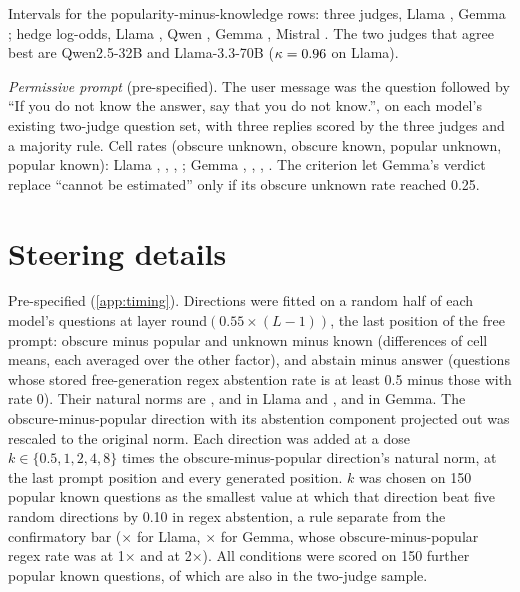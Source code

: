 \documentclass{article}
\begin{document}
Intervals for the popularity-minus-knowledge rows: three judges, Llama \tjLlamaDiffCI, Gemma \tjGemmaDiffCI; hedge log-odds, Llama \loLlamaDiffCI, Qwen \loQwenDiffCI, Gemma \loGemmaDiffCI, Mistral \loMistralDiffCI. The two judges that agree best are Qwen2.5-32B and Llama-3.3-70B ($\kappa=0.96$ on Llama).

\emph{Permissive prompt} (pre-specified). The user message was the question followed by ``If you do not know the answer, say that you do not know.'', on each model's existing two-judge question set, with three replies scored by the three judges and a majority rule. Cell rates (obscure unknown, obscure known, popular unknown, popular known): Llama \pmLlamaObsUnk, \pmLlamaObsKnown, \pmLlamaPopUnk, \pmLlamaPopKnown; Gemma \pmGemmaObsUnk, \pmGemmaObsKnown, \pmGemmaPopUnk, \pmGemmaPopKnown. The criterion let Gemma's verdict replace ``cannot be estimated'' only if its obscure unknown rate reached 0.25.

\section{Steering details}
\label{app:steer}

Pre-specified (\cref{app:timing}). Directions were fitted on a random half of each model's questions at layer round$(0.55\times(L-1))$, the last position of the free prompt: obscure minus popular and unknown minus known (differences of cell means, each averaged over the other factor), and abstain minus answer (questions whose stored free-generation regex abstention rate is at least 0.5 minus those with rate 0). Their natural norms are \svLlamaNormFam, \svLlamaNormKnow{} and \svLlamaNormAbst{} in Llama and \svGemmaNormFam, \svGemmaNormKnow{} and \svGemmaNormAbst{} in Gemma. The obscure-minus-popular direction with its abstention component projected out was rescaled to the original norm. Each direction was added at a dose $k\in\{0.5,1,2,4,8\}$ times the obscure-minus-popular direction's natural norm, at the last prompt position and every generated position. $k$ was chosen on 150 popular known questions as the smallest value at which that direction beat five random directions by 0.10 in regex abstention, a rule separate from the confirmatory bar (\svLlamaDose$\times$ for Llama, \svGemmaDose$\times$ for Gemma, whose obscure-minus-popular regex rate was \svGemmaSelOne{} at 1$\times$ and \svGemmaSelTwo{} at 2$\times$). All conditions were scored on 150 further popular known questions, \lkSteerOverlap{} of which are also in the two-judge sample.
\end{document}
